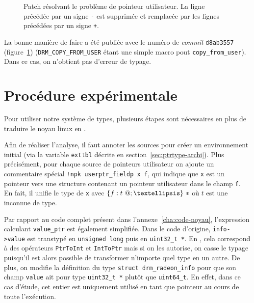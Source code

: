 \begin{figure}

  \caption[Patch résolvant le problème de pointeur utilisateur.]
      {Patch résolvant le problème de pointeur utilisateur.
       La ligne précédée par un signe \texttt{-} est supprimée et remplacée
       par les lignes précédées par un signe \texttt{+}.
      }
\label{fig:linux-patch}
\end{figure}

La bonne manière de faire a été publiée avec le numéro de \emph{commit}
\texttt{d8ab3557} (figure~\ref{fig:linux-patch}) (\texttt{DRM\_COPY\_FROM\_USER}
étant une simple macro pout \texttt{copy\_from\_user}). Dans ce cas, on
n'obtient pas d'erreur de typage.

\section{Procédure expérimentale}
\label{sec:demo-unif}

Pour utiliser notre système de types, plusieurs étapes sont nécessaires en plus
de traduire le noyau linux en \langname{}.

Afin de réaliser l'analyse, il faut annoter les sources pour créer un
environnement initial (via la variable \texttt{exttbl} décrite en
section~\ref{sec:ptrtype-archi}). Plus précisément, pour chaque source de
pointeurs utilisateur on ajoute un commentaire spécial \texttt{!npk
userptr\_fieldp x f}, qui indique que \texttt{x} est un pointeur vers une
structure contenant un pointeur utilisateur dans le champ \texttt{f}. En fait,
il unifie le type de \texttt{x} avec $\{ f: \ptrU{t} ; … \}~*$ où $t$ est une
inconnue de type.

Par rapport au code complet présent dans l'annexe~\ref{cha:code-noyau},
l'expression calculant \texttt{value_ptr} est également simplifiée. Dans le code
d'origine, \texttt{info->value} est transtypé en \texttt{unsigned long} puis en
\texttt{uint32\_t *}. En \newspeak, cela correspond à des opérateurs
\texttt{PtrToInt} \linebreak et \texttt{IntToPtr} mais si on les autorise, on
casse le typage puisqu'il est alors possible de transformer n'importe quel type
en un autre. De plus, on modifie la définition du type \texttt{struct
drm\_radeon\_info} pour que son champ \texttt{value} ait pour type
\texttt{uint32\_t *} plutôt que \texttt{uint64\_t}. En effet, dans ce cas
d'étude, cet entier est uniquement utilisé en tant que pointeur au cours de
toute l'exécution.

